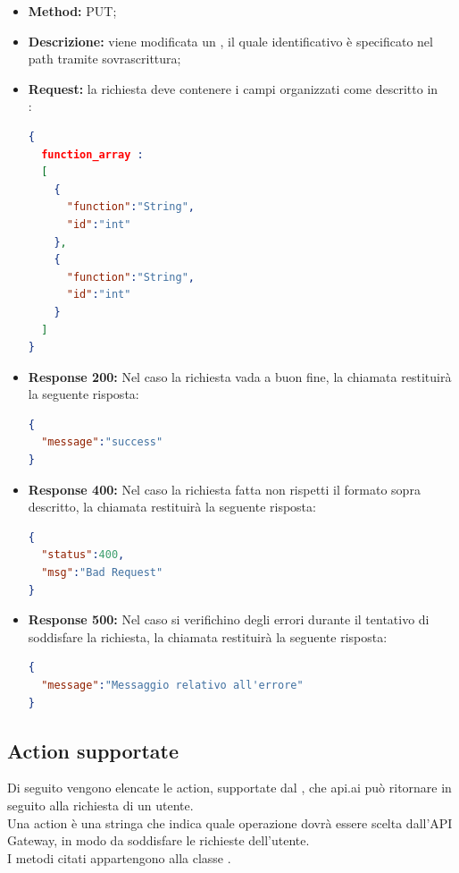 \begin{itemize}
\begin{itemize}
\item \textbf{Method:} PUT;
\item \textbf{Descrizione:} viene modificata un , il quale identificativo è specificato nel path tramite sovrascrittura;
\item \textbf{Request:} la richiesta deve contenere i campi organizzati come descritto in \\:
\begin{lstlisting}[language=json,firstnumber=1]
{
  function_array :
  [
    {
      "function":"String",
      "id":"int"
    },
    {
      "function":"String",
      "id":"int"
    }
  ]
}
\end{lstlisting}
\item \textbf{Response 200:} Nel caso la richiesta vada a buon fine, la chiamata restituirà la seguente risposta:
\begin{lstlisting}[language=json,firstnumber=1]
{
  "message":"success"
}
\end{lstlisting}
\item \textbf{Response 400:} Nel caso la richiesta fatta non rispetti il formato sopra descritto, la chiamata restituirà la seguente risposta:
\begin{lstlisting}[language=json,firstnumber=1]
{
  "status":400,
  "msg":"Bad Request"
}
\end{lstlisting}
\item \textbf{Response 500:} Nel caso si verifichino degli errori durante il tentativo di soddisfare la richiesta, la chiamata restituirà la seguente risposta:
\begin{lstlisting}[language=json,firstnumber=1]
{
  "message":"Messaggio relativo all'errore"
}
\end{lstlisting}
\end{itemize}

\end{itemize}
\newpage
\subsection{Action supportate} \label{action}
Di seguito vengono elencate le action, supportate dal , che api.ai può ritornare in seguito alla richiesta di un utente. \\
Una action è una stringa che indica quale operazione dovrà essere scelta dall'API Gateway, in modo da soddisfare le richieste dell'utente.\\
I metodi citati appartengono alla classe .
